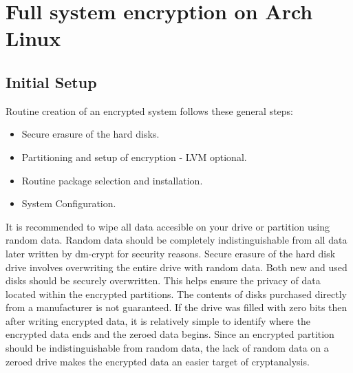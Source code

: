 
\section{Full system encryption on Arch Linux} %
\label{sec:dm-crypt}

\subsection{Initial Setup}

Routine creation of an encrypted system follows these general steps:
\begin{itemize}
	\item Secure erasure of the hard disks.
	\item Partitioning and setup of encryption - LVM optional.
	\item Routine package selection and installation.
	\item System Configuration.
\end{itemize}

It is recommended to wipe all data accesible on your drive or partition using random data. Random data should be completely indistinguishable from all data later written by dm-crypt for security reasons. Secure erasure of the hard disk drive involves overwriting the entire drive with random data.
Both new and used disks should be securely overwritten. This helps ensure the privacy of data located within the encrypted partitions. The contents of disks purchased directly from a manufacturer is not guaranteed. If the drive was filled with zero bits then after writing encrypted data, it is relatively simple to identify where the encrypted data ends and the zeroed data begins. Since an encrypted partition should be indistinguishable from random data, the lack of random data on a zeroed drive makes the encrypted data an easier target of cryptanalysis.
